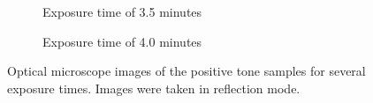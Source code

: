 \begin{figure}[htb]
\begin{subfigure}[t]{0.32\linewidth}
      	\caption{Exposure time of 3.5 minutes}
      	\label{fig:b3c1}
    \end{subfigure}
    \hfill
    \begin{subfigure}[t]{0.32\linewidth}
  	    \caption{Exposure time of 4.0 minutes}
  	    \label{fig:b3f1}
    \end{subfigure}
    \caption{Optical microscope images of the positive tone samples for several exposure times. Images were taken in reflection mode.}
\end{figure}



%

